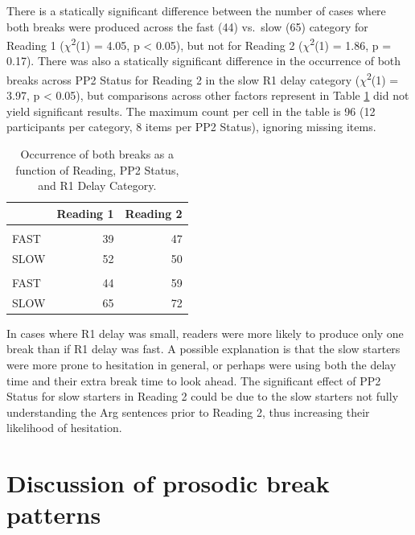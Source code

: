 \documentclass[12pt,oneside]{book}
\begin{document}
There is a statically significant difference between the number of cases where both breaks were produced across the fast (44) vs.~slow (65) category for Reading 1 (\(\chi\)\textsuperscript{2}(1) = 4.05, p \textless{} 0.05), but not for Reading 2 (\(\chi\)\textsuperscript{2}(1) = 1.86, p = 0.17). There was also a statically significant difference in the occurrence of both breaks across PP2 Status for Reading 2 in the slow R1 delay category (\(\chi\)\textsuperscript{2}(1) = 3.97, p \textless{} 0.05), but comparisons across other factors represent in Table \ref{tab:arg} did not yield significant results. The maximum count per cell in the table is 96 (12 participants per category, 8 items per PP2 Status), ignoring missing items.

\begin{table}[!h]

\caption{\label{tab:arg}Occurrence of both breaks as a function of Reading, PP2 Status, and R1 Delay Category.}
\centering
\begin{tabular}{lrr}
\toprule
  & Reading 1 & Reading 2\\
\midrule
\addlinespace[0.3em]
\multicolumn{3}{l}{\textbf{Mod}}\\
\hspace{1em}FAST & 39 & 47\\
\hspace{1em}SLOW & 52 & 50\\
\addlinespace[0.3em]
\multicolumn{3}{l}{\textbf{Arg}}\\
\hspace{1em}FAST & 44 & 59\\
\hspace{1em}SLOW & 65 & 72\\
\bottomrule
\end{tabular}
\end{table}

In cases where R1 delay was small, readers were more likely to produce only one break than if R1 delay was fast. A possible explanation is that the slow starters were more prone to hesitation in general, or perhaps were using both the delay time and their extra break time to look ahead. The significant effect of PP2 Status for slow starters in Reading 2 could be due to the slow starters not fully understanding the Arg sentences prior to Reading 2, thus increasing their likelihood of hesitation.

\hypertarget{discussion-of-prosodic-break-patterns}{%
\section{Discussion of prosodic break patterns}\label{discussion-of-prosodic-break-patterns}}
\end{document}
